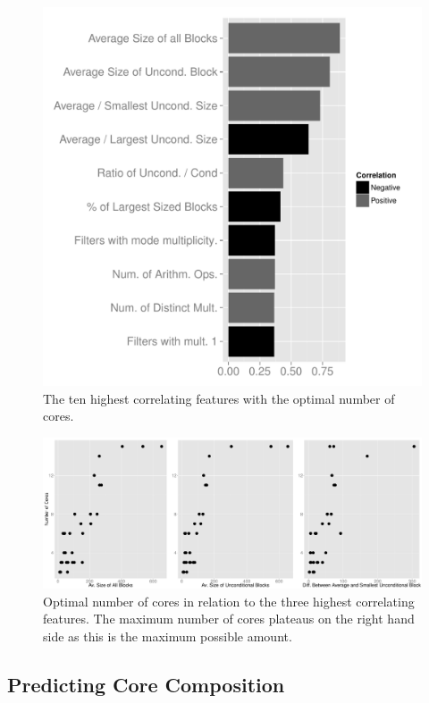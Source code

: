 
\begin{figure}[t]
  \includegraphics[width=1\textwidth]{streamit-paper/graphics/coreCorr.pdf}
  \caption{The ten highest correlating features with the optimal number of cores.}\label{fig:corrCore}
\end{figure}

\begin{figure}[t]
  \center
  \includegraphics[width=1\textwidth]{streamit-paper/graphics/lineargraphs.pdf}
  \caption{Optimal number of cores in relation to the three highest correlating features. The maximum number of cores plateaus on the right hand side as this is the maximum possible amount.}\label{fig:maxav}
\end{figure}

\subsection{Predicting Core Composition}

